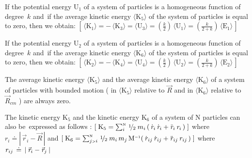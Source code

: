 \documentclass[10pt]{article}
\newcommand{\med}{\raise.5ex\hbox{$\scriptstyle 1$}\kern-.15em/\kern-.09em\lower.25ex\hbox{$\scriptstyle 2$}}
\begin{document}
\par \bigskip\smallskip \noindent If the potential energy ${\mathrm{U}}_1$ of a system of particles is a homogeneous function of \hbox {degree ${\mathit{k}}$} \hbox {and if} the average kinetic energy $\langle {\mathrm{K}}_5 \rangle$ of the system of particles is equal to zero, then we obtain: $[ \, \langle {\mathrm{K}}_1 \rangle = - \, \langle {\mathrm{K}}_3 \rangle = \langle {\mathrm{U}}_3 \rangle = (\frac{{\mathit{k}}}{2}) \, \langle {\mathrm{U}}_1 \rangle = (\frac{{\mathit{k}}}{2 + {\mathit{k}}}) \, \langle {\mathrm{E}}_1 \rangle \, ]$

\par \bigskip\smallskip \noindent If the potential energy ${\mathrm{U}}_2$ of a system of particles is a homogeneous function of \hbox {degree ${\mathit{k}}$} \hbox {and if} the average kinetic energy $\langle {\mathrm{K}}_6 \rangle$ of the system of particles is equal to zero, then we obtain: $[ \, \langle {\mathrm{K}}_2 \rangle = - \, \langle {\mathrm{K}}_4 \rangle = \langle {\mathrm{U}}_4 \rangle = (\frac{{\mathit{k}}}{2}) \, \langle {\mathrm{U}}_2 \rangle = (\frac{{\mathit{k}}}{2 + {\mathit{k}}}) \, \langle {\mathrm{E}}_2 \rangle \, ]$

\newpage

\par \bigskip\smallskip \noindent The average kinetic energy $\langle {\mathrm{K}}_5 \rangle$ and the average kinetic energy $\langle {\mathrm{K}}_6 \rangle$ of a system of particles with bounded motion ( in $\langle {\mathrm{K}}_5 \rangle$ relative to ${\vec{\mathit{R}}}$ \hspace{+0.090em}and\hspace{+0.090em} in $\langle {\mathrm{K}}_6 \rangle$ relative to ${\vec{\mathit{R}}}_{cm}$ ) are always zero.

\par \bigskip\smallskip \noindent The kinetic energy ${\mathrm{K}}_5$ and the kinetic energy ${\mathrm{K}}_6$ of a system of N particles can also \hbox {be expressed} as follows : $[ \; {\mathrm{K}}_5 = \sum_i^{\scriptscriptstyle{\mathrm{N}}} \, \med \; m_i \, ( \, {\dot{\mathit{r}}}_{i} \, {\dot{\mathit{r}}}_{i} + {\ddot{\mathit{r}}}_{i} \, {\mathit{r}}_{i} \, ) \; ]$ where ${\mathit{r}}_{i} \doteq | \, {\vec{\mathit{r}}}_{i} - {\vec{\mathit{R}}} \, |$ and \hbox {$[ \; {\mathrm{K}}_6 = \sum_{j{\scriptscriptstyle >}i}^{\scriptscriptstyle{\mathrm{N}}} \, \med \; m_i \, m_j \, {\mathrm{M}}^{\scriptscriptstyle -1} ( \, {\dot{\mathit{r}}}_{\hspace{+0.060em}ij} \, {\dot{\mathit{r}}}_{\hspace{+0.060em}ij} + {\ddot{\mathit{r}}}_{\hspace{+0.060em}ij} \, {\mathit{r}}_{\hspace{+0.060em}ij} \, ) \; ]$} where ${\mathit{r}}_{\hspace{+0.060em}ij} \,\doteq\, | \: {\vec{\mathit{r}}}_{i} - {\vec{\mathit{r}}}_{j} \: |$
\end{document}
